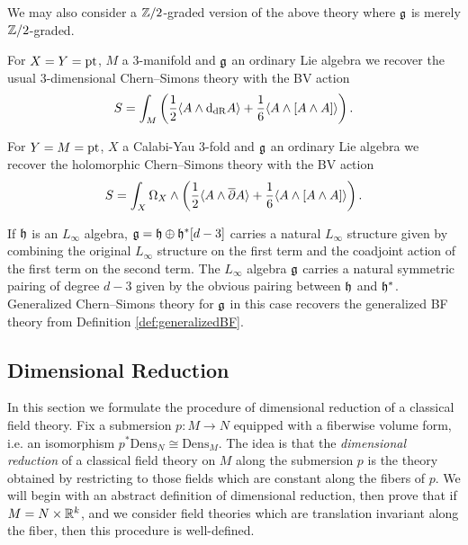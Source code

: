 \documentclass[10pt, oneside]{article}
\newcommand{\Dens}{\mathrm{Dens}}
\begin{document}
We may also consider a $\mathbb Z/2$-graded version of the above theory where $\mathfrak g$ is merely $\mathbb Z/2$-graded.

\begin{example}
For $X=Y=\operatorname{pt}$, $M$ a 3-manifold and $\mathfrak g$ an ordinary Lie algebra we recover the usual 3-dimensional Chern--Simons theory with the BV action
\[S = \int_M \left(\frac{1}{2}\langle A\wedge {\rm d}_{\mathrm{dR}} A\rangle + \frac{1}{6}\langle A\wedge [A\wedge A]\rangle\right).\]
\end{example}

\begin{example}
For $Y=M=\operatorname{pt}$, $X$ a Calabi-Yau 3-fold and $\mathfrak g$ an ordinary Lie algebra we recover the holomorphic Chern--Simons theory with the BV action
\[S = \int_X \Omega_X\wedge \left(\frac{1}{2}\langle A\wedge \overline{\partial} A\rangle + \frac{1}{6}\langle A\wedge [A\wedge A]\rangle\right).\]
\end{example}

\begin{example}
If $\mathfrak h$ is an $L_\infty$ algebra, $\mathfrak g = \mathfrak h \oplus \mathfrak h^*[d-3]$ carries a natural $L_\infty$ structure given by combining the original $L_\infty$ structure on the first term and the coadjoint action of the first term on the second term. The $L_\infty$ algebra $\mathfrak g$ carries a natural symmetric pairing of degree $d-3$ given by the obvious pairing between $\mathfrak h$ and $\mathfrak h^*$. Generalized Chern--Simons theory for $\mathfrak g$ in this case recovers the generalized BF theory from Definition \ref{def:generalizedBF}.
\end{example}

\subsection{Dimensional Reduction} \label{dim_red_section}

In this section we formulate the procedure of dimensional reduction of a classical field theory. Fix a submersion $p\colon M\rightarrow N$ equipped with a fiberwise volume form, i.e. an isomorphism $p^*\Dens_N\cong \Dens_M$.  The idea is that the \emph{dimensional reduction} of a classical field theory on $M$ along the submersion $p$ is the theory obtained by restricting to those fields which are constant along the fibers of $p$.  We will begin with an abstract definition of dimensional reduction, then prove that if $M = N \times \mathbb R^k$, and we consider field theories which are translation invariant along the fiber, then this procedure is well-defined.
\end{document}
